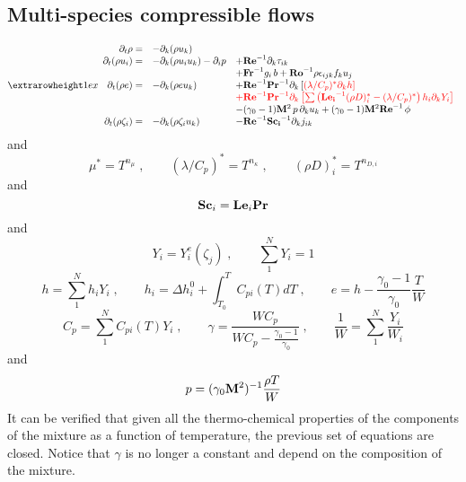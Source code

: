 \subsection{Multi-species compressible flows}

\begin{equation}
\setlength{\extrarowheight}{1ex}
\begin{array}{rll}
  \partial_t \rho =&
  -\partial_k (\rho u_k)  & \\
  \partial_t (\rho u_i) =& 
  -\partial_k (\rho u_i u_k )-\partial_i p  &
  +\mathrm{\bf Re}^{-1}\partial_k \tau_{ik} \\
  & & +\mathrm{\bf Fr}^{-1} g_i\,b+\mathrm{\bf Ro}^{-1}\rho\epsilon_{ijk} f_ku_j  \\
  \partial_t (\rho e) =& 
  -\partial_k (\rho e u_k ) &
  +\mathrm{\bf Re}^{-1}\mathrm{\bf Pr}^{-1} \partial_k \left[\color{red}{(\lambda/C_p)^{*} \partial_k h}\right] \\
  & & \color{red}{+\mathrm{\bf Re}^{-1}\mathrm{\bf Pr}^{-1} \partial_k\left[\sum\left(\mathrm{\bf Le_i}^{-1}(\rho D)_i^*-
  (\lambda/C_p)^*\right)h_i \partial_k Y_i\right]} \\
  & &-(\gamma_0-1)\mathrm{\bf M}^2\,p\, \partial_k u_k  + (\gamma_0-1)\mathrm{\bf M}^2\mathrm{\bf Re}^{-1}\,\phi \\
  \partial_t (\rho \zeta_i)=&
  -\partial_k (\rho \zeta_i u_k) &
  - \mathrm{\bf Re}^{-1}\mathrm{\bf Sc_i}^{-1} \partial_k j_{ik}
\end{array}
\end{equation}
and
\begin{equation}
  \mu^{*} = T^{n_\mu}\;,\qquad (\lambda/C_p)^{*} = T^{n_\kappa} \;,\qquad (\rho
  D)_i^{*} = T^{n_{D,i}}
\end{equation}
and 
\begin{equation}
\mathrm{\bf Sc}_i = \mathrm{\bf Le}_i \mathrm{\bf Pr}
\end{equation}
and 
\begin{equation}
  Y_i = Y^e_i(\zeta_j)\;, \qquad \sum^N_1 Y_i=1 
\end{equation}
\begin{equation}
  h = \sum^N_1 h_{i} Y_i \;,\qquad h_{i} = \Delta h^0_i + \int^{T}_{T_0}
  C_{pi}(T) dT\;,\qquad e = h - \frac{\gamma_0-1}{\gamma_0}\frac{T}{W} 
\end{equation}
\begin{equation}
  C_p = \sum^N_1 C_{pi}(T) Y_i\;,\qquad
  \gamma = \frac{W C_p}{W C_p-\frac{\gamma_0-1}{\gamma_0}} \;,\qquad
  \frac{1}{W} = \sum^N_1 \frac{Y_i}{W_i} 
\end{equation}
and
\begin{equation}
  p = (\gamma_0 \mathrm{\bf M}^2)^{-1} \frac{\rho T}{W} 
\end{equation}
It can be verified that given all the thermo-chemical properties of the components of the mixture as a function of temperature, the previous set of equations are closed. Notice that $\gamma$ is no longer a constant and depend on the composition of the mixture.

